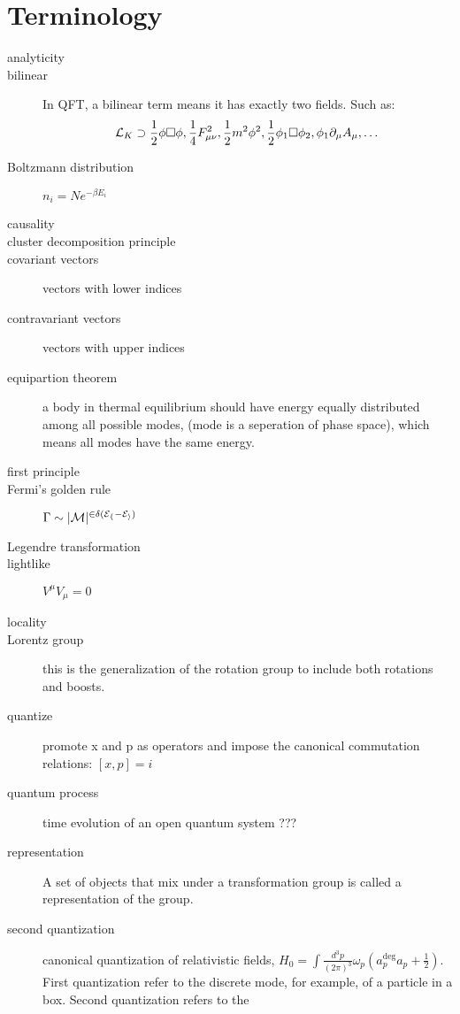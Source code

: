 \chapter{Terminology}
\begin{description}
    \item [analyticity]
    \item [bilinear]	In QFT, a bilinear term means it has exactly two
	fields. Such as:
	\[ \mathcal{L}_K \supset \frac{1}{2}\phi\Box\phi,
	\frac{1}{4}F^2_{\mu\nu}, \frac{1}{2}m^2\phi^2,
	\frac{1}{2}\phi_1\Box\phi_2, \phi_1\partial_\mu A_\mu, \dots \]
    \item [Boltzmann distribution]  $n_{i} = Ne^{-\beta E_{i}}$
    \item [causality]
    \item [cluster decomposition principle]
    \item [covariant vectors]	vectors with lower indices
    \item [contravariant vectors]   vectors with upper indices
    \item [equipartion theorem] a body in thermal equilibrium should have
	energy equally distributed among all possible modes, (mode is a
	seperation of phase space), which means all modes have the same
	energy.
    \item [first principle]
    \item [Fermi's golden rule]	$\Gamma \sim |\cal{M}|^{2\delta(E_f - E_i)}$
    \item [Legendre transformation]
    \item [lightlike]	$V^\mu V_\mu = 0$
    \item [locality]
    \item [Lorentz group] this is the generalization of the rotation group
	to include both rotations and boosts.
    \item [quantize]	promote x and p as operators and impose the
	canonical commutation relations:    $[x, p] = i$
    \item [quantum process]  time evolution of an open quantum system ???
    \item [representation] A set of objects that mix under a transformation
	group is called a representation of the group. 
    \item [second quantization]	canonical quantization of relativistic
	fields, $H_0 = \int \frac{d^{3}p}{(2\pi)^3}\omega_p(a^{\deg}_p a_p +
	\frac{1}{2})$. First quantization refer to the discrete mode, for
	example, of a particle in a box. Second quantization refers to the

\end{description}
